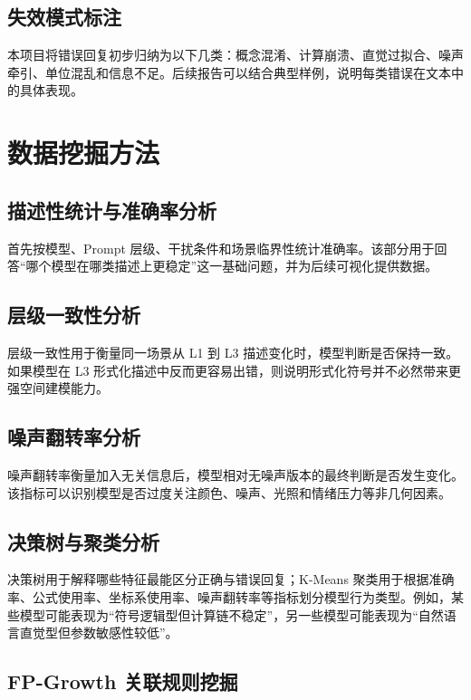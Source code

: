 \documentclass{BJUTReport}
\begin{document}
\subsection{失效模式标注}

本项目将错误回复初步归纳为以下几类：概念混淆、计算崩溃、直觉过拟合、噪声牵引、单位混乱和信息不足。后续报告可以结合典型样例，说明每类错误在文本中的具体表现。

\section{数据挖掘方法}

\subsection{描述性统计与准确率分析}

首先按模型、Prompt 层级、干扰条件和场景临界性统计准确率。该部分用于回答“哪个模型在哪类描述上更稳定”这一基础问题，并为后续可视化提供数据。

\subsection{层级一致性分析}

层级一致性用于衡量同一场景从 L1 到 L3 描述变化时，模型判断是否保持一致。如果模型在 L3 形式化描述中反而更容易出错，则说明形式化符号并不必然带来更强空间建模能力。

\subsection{噪声翻转率分析}

噪声翻转率衡量加入无关信息后，模型相对无噪声版本的最终判断是否发生变化。该指标可以识别模型是否过度关注颜色、噪声、光照和情绪压力等非几何因素。

\subsection{决策树与聚类分析}

决策树用于解释哪些特征最能区分正确与错误回复；K-Means 聚类用于根据准确率、公式使用率、坐标系使用率、噪声翻转率等指标划分模型行为类型。例如，某些模型可能表现为“符号逻辑型但计算链不稳定”，另一些模型可能表现为“自然语言直觉型但参数敏感性较低”。

\subsection{FP-Growth 关联规则挖掘}
\end{document}
